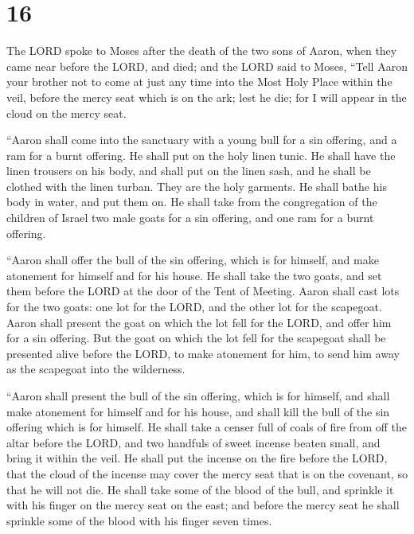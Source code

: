 \hypertarget{section-15}{%
\section{16}\label{section-15}}

 The LORD spoke to Moses after the death of the two sons
of Aaron, when they came near before the LORD, and died; 
and the LORD said to Moses, ``Tell Aaron your brother not to come at
just any time into the Most Holy Place within the veil, before the mercy
seat which is on the ark; lest he die; for I will appear in the cloud on
the mercy seat.

 ``Aaron shall come into the sanctuary with a young bull
for a sin offering, and a ram for a burnt offering.  He
shall put on the holy linen tunic. He shall have the linen trousers on
his body, and shall put on the linen sash, and he shall be clothed with
the linen turban. They are the holy garments. He shall bathe his body in
water, and put them on.  He shall take from the
congregation of the children of Israel two male goats for a sin
offering, and one ram for a burnt offering.

 ``Aaron shall offer the bull of the sin offering, which
is for himself, and make atonement for himself and for his house.
 He shall take the two goats, and set them before the LORD
at the door of the Tent of Meeting.  Aaron shall cast lots
for the two goats: one lot for the LORD, and the other lot for the
scapegoat.  Aaron shall present the goat on which the lot
fell for the LORD, and offer him for a sin offering.  But
the goat on which the lot fell for the scapegoat shall be presented
alive before the LORD, to make atonement for him, to send him away as
the scapegoat into the wilderness.

 ``Aaron shall present the bull of the sin offering,
which is for himself, and shall make atonement for himself and for his
house, and shall kill the bull of the sin offering which is for himself.
 He shall take a censer full of coals of fire from off
the altar before the LORD, and two handfuls of sweet incense beaten
small, and bring it within the veil.  He shall put the
incense on the fire before the LORD, that the cloud of the incense may
cover the mercy seat that is on the covenant, so that he will not die.
 He shall take some of the blood of the bull, and
sprinkle it with his finger on the mercy seat on the east; and before
the mercy seat he shall sprinkle some of the blood with his finger seven
times.

